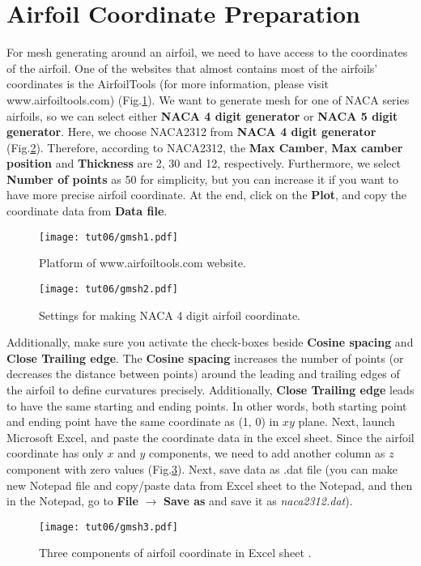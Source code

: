 \section{Airfoil Coordinate Preparation}
For mesh generating around an airfoil, we need to have access to the coordinates of the airfoil. One of the websites that almost contains most of the airfoils' coordinates is the AirfoilTools (for more information, please visit www.airfoiltools.com) (Fig.\ref{fig6:gmsh1}). We want to generate mesh for one of NACA series airfoils, so we can select either \textbf{NACA 4 digit generator} or \textbf{NACA 5 digit generator}. Here, we choose NACA2312 from \textbf{NACA 4 digit generator} (Fig.\ref{fig6:gmsh2}). Therefore, according to NACA2312, the \textbf{Max Camber}, \textbf{Max camber position} and \textbf{Thickness} are 2, 30 and 12, respectively. Furthermore, we select \textbf{Number of points} as 50 for simplicity, but you can increase it if you want to have more precise airfoil coordinate. At the end, click on the \textbf{Plot}, and copy the coordinate data from \textbf{Data file}.
\begin{figure}[htbp]
    \centering
    \texttt{[image: tut06/gmsh1.pdf]}
    \caption{Platform of www.airfoiltools.com website.}
    \label{fig6:gmsh1}
\end{figure}
\begin{figure}[htbp]
    \centering
    \texttt{[image: tut06/gmsh2.pdf]}
    \caption{Settings for making NACA 4 digit airfoil coordinate.}
    \label{fig6:gmsh2}
\end{figure}
Additionally, make sure you activate the check-boxes beside \textbf{Cosine spacing} and \textbf{Close Trailing edge}. The \textbf{Cosine spacing} increases the number of points (or decreases the distance between points) around the leading and trailing edges of the airfoil to define curvatures precisely. Additionally, \textbf{Close Trailing edge} leads to have the same starting and ending points. In other words, both starting point and ending point have the same coordinate as (1, 0) in $xy$ plane. 
Next, launch Microsoft Excel, and paste the coordinate data in the excel sheet. Since the airfoil coordinate has only $x$ and $y$ components, we need to add another column as $z$ component with zero values (Fig.\ref{fig6:gmsh3}). Next, save data as .dat file (you can make new Notepad file and copy/paste data from Excel sheet to the Notepad, and then in the Notepad, go to \textbf{File} $\rightarrow$ \textbf{Save as} and save it as \textit{naca2312.dat}).
\begin{figure}[htbp]
    \centering
    \texttt{[image: tut06/gmsh3.pdf]}
    \caption{Three components of airfoil coordinate in Excel sheet .}
    \label{fig6:gmsh3}
\end{figure}
